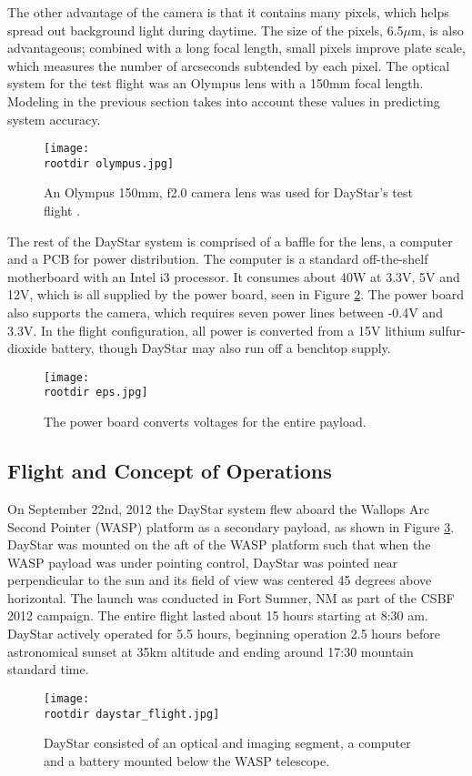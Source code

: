\documentclass[twocolumn,letterpaper]{IEEEAerospace2012}
\newcommand{\rootdir}{./Figures/}
\begin{document}
The other advantage of the camera is that it contains many pixels, which helps spread out background light during daytime. The size of the pixels, 6.5$\mu$m, is also advantageous; combined with a long focal length, small pixels improve plate scale, which measures the number of arcseconds subtended by each pixel. The optical system for the test flight was an Olympus lens with a 150mm focal length. Modeling in the previous section takes into account these values in predicting system accuracy.
\begin{figure}[H]
    \centering
    \texttt{[image: \\rootdir olympus.jpg]}
    \caption{An Olympus 150mm, f2.0 camera lens was used for DayStar's test flight \protect\cite{olympus}.}
    \label{fig:olympus}
\end{figure}
The rest of the DayStar system is comprised of a baffle for the lens, a computer and a PCB for power distribution. The computer is a standard off-the-shelf motherboard with an Intel i3 processor. It consumes about 40W at 3.3V, 5V and 12V, which is all supplied by the power board, seen in Figure \ref{fig:power}. The power board also supports the camera, which requires seven power lines between -0.4V and 3.3V. In the flight configuration, all power is converted from a 15V lithium sulfur-dioxide battery, though DayStar may also run off a benchtop supply.
\begin{figure}[H]
    \texttt{[image: \\rootdir eps.jpg]}
    \caption{The power board converts voltages for the entire payload.}
    \label{fig:power}
\end{figure}

\subsection{Flight and Concept of Operations}
On September 22nd, 2012 the DayStar system flew aboard the Wallops Arc Second Pointer (WASP) platform as a secondary payload, as shown in Figure \ref{fig:flight}. DayStar was mounted on the aft of the WASP platform such that when the WASP payload was under pointing control, DayStar was pointed near perpendicular to the sun and its field of view was centered 45 degrees above horizontal. The launch was conducted in Fort Sumner, NM as part of the CSBF 2012 campaign. The entire flight lasted about 15 hours starting at 8:30 am. DayStar actively operated for 5.5 hours, beginning operation 2.5 hours before astronomical sunset at 35km altitude and ending around 17:30 mountain standard time.
\begin{figure}
    \centering
    \texttt{[image: \\rootdir daystar\_flight.jpg]}
    \caption{DayStar consisted of an optical and imaging segment, a computer and a battery mounted below the WASP telescope.}
    \label{fig:flight}
\end{figure}
\end{document}
